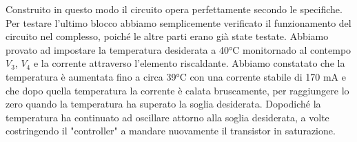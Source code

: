 Construito in questo modo il circuito opera perfettamente secondo le specifiche. Per testare l'ultimo blocco abbiamo semplicemente
verificato il funzionamento del circuito nel complesso, poiché le altre parti erano già state testate. Abbiamo provato ad impostare
la temperatura desiderata a 40\si{\celsius} monitornado al contempo $V_3$, $V_4$ e la corrente attraverso l'elemento riscaldante.
Abbiamo constatato che la temperatura è aumentata fino a circa 39\si{\celsius} con una corrente stabile di 170 mA e che dopo quella temperatura
la corrente è calata bruscamente, per raggiungere lo zero quando la temperatura ha superato la soglia desiderata. Dopodiché
la temperatura ha continuato ad oscillare attorno alla soglia desiderata, a volte costringendo il "controller" a mandare nuovamente il
transistor in saturazione.
